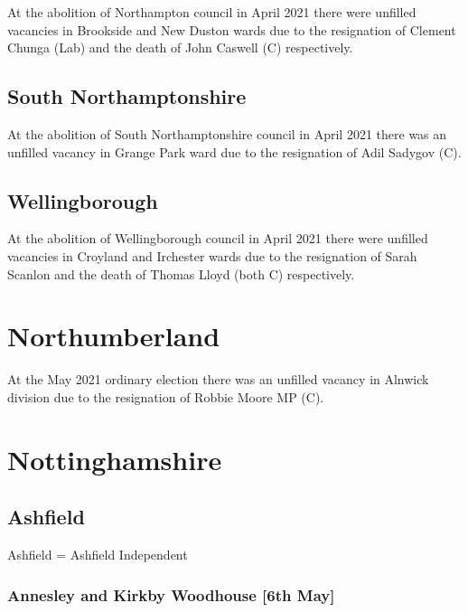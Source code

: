 \documentclass[a4paper,openany]{book}
\begin{document}
\begin{resultsiii}
At the abolition of Northampton council in April 2021 there were unfilled vacancies in Brookside and New Duston wards due to the resignation of Clement Chunga (Lab) and the death of John Caswell (C) respectively.

\subsection*{South Northamptonshire}

At the abolition of South Northamptonshire council in April 2021 there was an unfilled vacancy in Grange Park ward due to the resignation of Adil Sadygov (C).

\subsection*{Wellingborough}

At the abolition of Wellingborough council in April 2021 there were unfilled vacancies in Croyland and Irchester wards due to the resignation of Sarah Scanlon and the death of Thomas Lloyd (both C) respectively.

\section{Northumberland}

At the May 2021 ordinary election there was an unfilled vacancy in Alnwick division due to the resignation of Robbie Moore MP (C).%

\section{Nottinghamshire}

\subsection*{Ashfield}

Ashfield = Ashfield Independent

\subsubsection*{Annesley and Kirkby Woodhouse \hspace*{\fill}\nolinebreak[1]%
	\enspace\hspace*{\fill}
	[6th May]}


\end{resultsiii}
\end{document}
